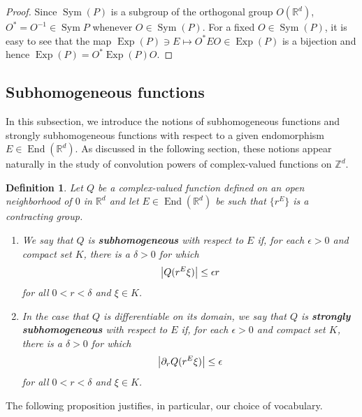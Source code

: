 \documentclass[11pt]{article}
\newtheorem{definition}[theorem]{Definition}
\theoremstyle{remark}
\newcommand\End{\operatorname{End}} %
\newcommand\Sym{\operatorname{Sym}}
\newcommand\Exp{\operatorname{Exp}}
\begin{document}
\begin{proof}
Since $\Sym(P)$ is a subgroup of the orthogonal group $O(\mathbb{R}^d)$, $O^* = O^{-1} \in \Sym{P}$ whenever $O\in\Sym(P)$. For a fixed $O\in\Sym(P)$, it is easy to see that the map $\Exp(P)\ni E\mapsto  O^* E O\in\Exp(P)$ is a bijection and hence $\Exp(P)=O^* \Exp(P) O$. 
\end{proof}

\subsection{Subhomogeneous functions}\label{subsec:SubhomogeneousFunctions}
In this subsection, we introduce the notions of subhomogeneous functions and strongly subhomogeneous functions with respect to a given endomorphism $E\in\End(\mathbb{R}^d)$. As discussed in the following section, these notions appear naturally in the study of convolution powers of complex-valued functions on $\mathbb{Z}^d$.

\begin{definition}\label{def:homogeneous_types}
Let $Q$ be a complex-valued function defined on an open neighborhood of $0$ in $\mathbb{R}^d$ and let $E\in\End(\mathbb{R}^d)$ be such that $\{r^E\}$ is a contracting group.
\begin{enumerate}
\item We say that $Q$ is \textbf{subhomogeneous} with respect to $E$ if, for each $\epsilon>0$ and compact set $K$, there is a $\delta>0$ for which
\begin{equation*}
\abs{Q(r^E\xi)}\leq \epsilon r
\end{equation*}
for all $0<r<\delta$ and $\xi\in K$.
\item In the case that $Q$ is differentiable on its domain, we say that $Q$ is \textbf{strongly subhomogeneous} with respect to $E$ if, for each $\epsilon>0$ and compact set $K$, there is a $\delta>0$ for which
\begin{equation*}
\abs{\partial_r Q(r^E\xi)}\leq \epsilon
\end{equation*}
for all $0<r<\delta$ and $\xi\in K$.
\end{enumerate}
\end{definition}

\noindent The following proposition justifies, in particular, our choice of vocabulary.
\end{document}
